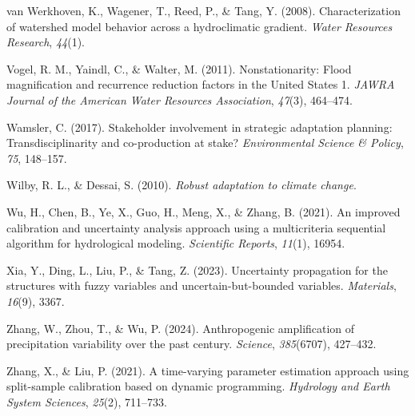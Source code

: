 \documentclass[
]{article}
\begin{document}
van Werkhoven, K., Wagener, T., Reed, P., \& Tang, Y. (2008).
Characterization of watershed model behavior across a hydroclimatic
gradient. \emph{Water Resources Research}, \emph{44}(1).

Vogel, R. M., Yaindl, C., \& Walter, M. (2011). Nonstationarity: Flood
magnification and recurrence reduction factors in the United States 1.
\emph{JAWRA Journal of the American Water Resources Association},
\emph{47}(3), 464--474.

Wamsler, C. (2017). Stakeholder involvement in strategic adaptation
planning: Transdisciplinarity and co-production at stake?
\emph{Environmental Science \& Policy}, \emph{75}, 148--157.

Wilby, R. L., \& Dessai, S. (2010). \emph{Robust adaptation to climate
change}.

Wu, H., Chen, B., Ye, X., Guo, H., Meng, X., \& Zhang, B. (2021). An
improved calibration and uncertainty analysis approach using a
multicriteria sequential algorithm for hydrological modeling.
\emph{Scientific Reports}, \emph{11}(1), 16954.

Xia, Y., Ding, L., Liu, P., \& Tang, Z. (2023). Uncertainty propagation
for the structures with fuzzy variables and uncertain-but-bounded
variables. \emph{Materials}, \emph{16}(9), 3367.

Zhang, W., Zhou, T., \& Wu, P. (2024). Anthropogenic amplification of
precipitation variability over the past century. \emph{Science},
\emph{385}(6707), 427--432.

Zhang, X., \& Liu, P. (2021). A time-varying parameter estimation
approach using split-sample calibration based on dynamic programming.
\emph{Hydrology and Earth System Sciences}, \emph{25}(2), 711--733.
\end{document}
